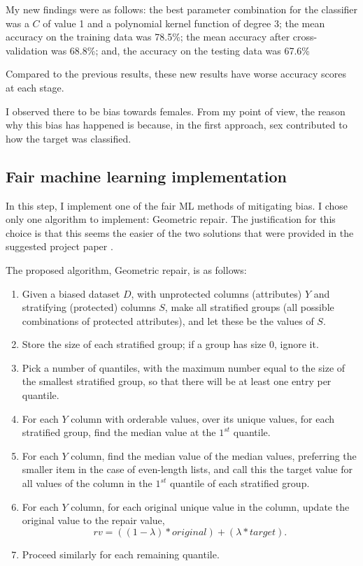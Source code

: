 \documentclass[conference]{IEEEtran}
\begin{document}
My new findings were as follows: the best parameter combination for the classifier was a $C$ of value 1 and a polynomial kernel function of degree 3; the mean accuracy on the training data was 78.5\%; the mean accuracy after cross-validation was 68.8\%; and, the accuracy on the testing data was 67.6\%

Compared to the previous results, these new results have worse accuracy scores at each stage.

I observed there to be bias towards females. From my point of view, the reason why this bias has happened is because, in the first approach, sex contributed to how the target was classified.

\subsection{Fair machine learning implementation}
In this step, I implement one of the fair ML methods of mitigating bias. I chose only one algorithm to implement: Geometric repair. The justification for this choice is that this seems the easier of the two solutions that were provided in the suggested project paper \cite{Feldman2015ComputationalFP}.

The proposed algorithm, Geometric repair, is as follows:
\begin{enumerate}
    \item Given a biased dataset $D$, with unprotected columns (attributes) $Y$ and stratifying (protected) columns $S$, make all stratified groups (all possible combinations of protected attributes), and let these be the values of $S$.
    \item Store the size of each stratified group; if a group has size 0, ignore it.
    \item Pick a number of quantiles, with the maximum number equal to the size of the smallest stratified group, so that there will be at least one entry per quantile. 
    \item For each $Y$ column with orderable values, over its unique values, for each stratified group, find the median value at the $1^{st}$ quantile.
    \item For each $Y$ column, find the median value of the median values, preferring the smaller item in the case of even-length lists, and call this the target value for all values of the column in the $1^{st}$ quantile of each stratified group.
    \item For each $Y$ column, for each original unique value in the column, update the original value to the repair value, $$rv = ((1 - \lambda) * original) + (\lambda * target).$$
    \item Proceed similarly for each remaining quantile.     
\end{enumerate}
\end{document}
